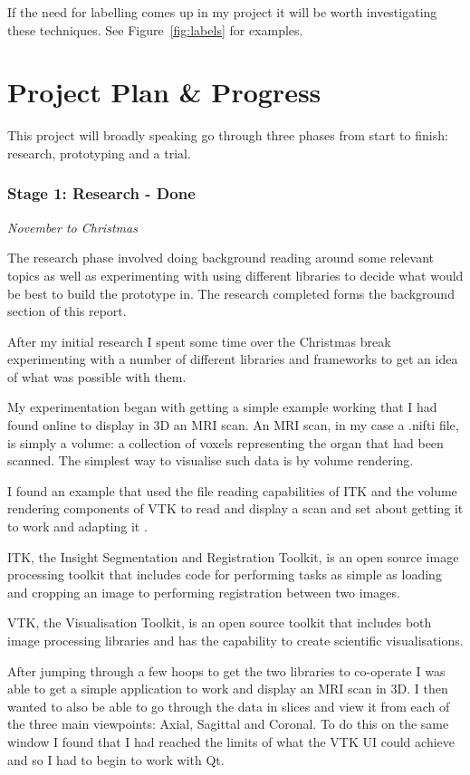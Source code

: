 \documentclass[
  oneside,
  11pt, a4paper,
  footinclude=true,
  headinclude=true,
  cleardoublepage=empty
]{scrbook}
\begin{document}
If the need for labelling comes up in my project it will be worth investigating these techniques. See Figure~\ref{fig:labels} for examples.

\chapter{Project Plan \& Progress}
This project will broadly speaking go through three phases from start to finish: research, prototyping and a trial.

\subsection*{Stage 1: Research - Done}
\textit{November to Christmas}

The research phase involved doing background reading around some relevant topics as well as experimenting with using different libraries to decide what would be best to build the prototype in. The research completed forms the background section of this report.

After my initial research I spent some time over the Christmas break experimenting with a number of different libraries and frameworks to get an idea of what was possible with them.

My experimentation began with getting a simple example working that I had found online to display in 3D an MRI scan. An MRI scan, in my case a .nifti file, is simply a volume: a collection of voxels representing the organ that had been scanned. The simplest way to visualise such data is by volume rendering.

I found an example that used the file reading capabilities of ITK and the volume rendering components of VTK to read and display a scan and set about getting it to work and adapting it \cite{niftivtk}.


ITK, the Insight Segmentation and Registration Toolkit, is an open source image processing toolkit that includes code for performing tasks as simple as loading and cropping an image to performing registration between two images.

VTK, the Visualisation Toolkit, is an open source toolkit that includes both image processing libraries and has the capability to create scientific visualisations.

After jumping through a few hoops to get the two libraries to co-operate I was able to get a simple application to work and display an MRI scan in 3D. I then wanted to also be able to go through the data in slices and view it from each of the three main viewpoints: Axial, Sagittal and Coronal. To do this on the same window I found that I had reached the limits of what the VTK UI could achieve and so I had to begin to work with Qt.
\end{document}
